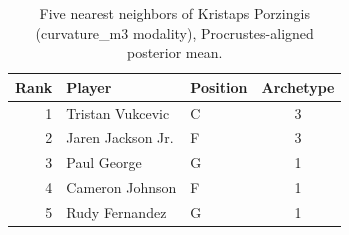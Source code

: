 \begin{table}[htbp]
  \centering\small
  \begin{tabular}{rllc}
    \toprule
    Rank & Player & Position & Archetype \\
    \midrule
    1 & Tristan Vukcevic & C & 3 \\
    2 & Jaren Jackson Jr. & F & 3 \\
    3 & Paul George & G & 1 \\
    4 & Cameron Johnson & F & 1 \\
    5 & Rudy Fernandez & G & 1 \\
    \bottomrule
  \end{tabular}
  \caption{Five nearest neighbors of Kristaps Porzingis (curvature_m3 modality), Procrustes-aligned posterior mean.}
  \label{tab:Kristaps_Porzingis_neighbors_curvature_m3}
\end{table}

